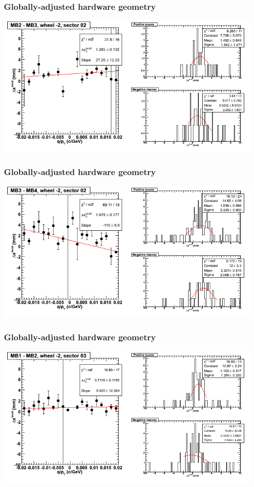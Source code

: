 \documentclass[compress]{beamer}
\begin{document}
\begin{frame}
\frametitle{Globally-adjusted hardware geometry}
\includegraphics[width=\linewidth]{NOV4_segdiffs_HW/dt13_resid_A_02_23.png}
\end{frame}

\begin{frame}
\frametitle{Globally-adjusted hardware geometry}
\includegraphics[width=\linewidth]{NOV4_segdiffs_HW/dt13_resid_A_02_34.png}
\end{frame}

\begin{frame}
\frametitle{Globally-adjusted hardware geometry}
\includegraphics[width=\linewidth]{NOV4_segdiffs_HW/dt13_resid_A_03_12.png}
\end{frame}
\end{document}

